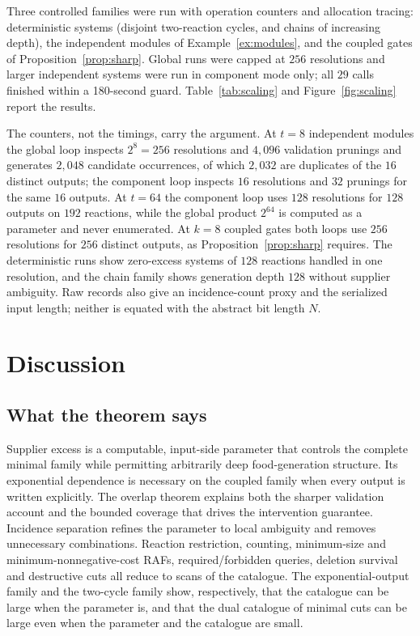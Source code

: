 \documentclass[11pt,a4paper]{article}
\theoremstyle{plain}
\theoremstyle{definition}
\theoremstyle{remark}
\begin{document}
Three controlled families were run with operation counters and allocation tracing: deterministic systems (disjoint two-reaction cycles, and chains of increasing depth), the independent modules of Example~\ref{ex:modules}, and the coupled gates of Proposition~\ref{prop:sharp}. Global runs were capped at $256$ resolutions and larger independent systems were run in component mode only; all $29$ calls finished within a 180-second guard. Table~\ref{tab:scaling} and Figure~\ref{fig:scaling} report the results.

The counters, not the timings, carry the argument. At $t=8$ independent modules the global loop inspects $2^8=256$ resolutions and $4{,}096$ validation prunings and generates $2{,}048$ candidate occurrences, of which $2{,}032$ are duplicates of the $16$ distinct outputs; the component loop inspects $16$ resolutions and $32$ prunings for the same $16$ outputs. At $t=64$ the component loop uses $128$ resolutions for $128$ outputs on $192$ reactions, while the global product $2^{64}$ is computed as a parameter and never enumerated. At $k=8$ coupled gates both loops use $256$ resolutions for $256$ distinct outputs, as Proposition~\ref{prop:sharp} requires. The deterministic runs show zero-excess systems of $128$ reactions handled in one resolution, and the chain family shows generation depth $128$ without supplier ambiguity. Raw records also give an incidence-count proxy and the serialized input length; neither is equated with the abstract bit length $N$.

\section{Discussion}\label{sec:discussion}

\subsection{What the theorem says}

Supplier excess is a computable, input-side parameter that controls the complete minimal family while permitting arbitrarily deep food-generation structure. Its exponential dependence is necessary on the coupled family when every output is written explicitly. The overlap theorem explains both the sharper validation account and the bounded coverage that drives the intervention guarantee. Incidence separation refines the parameter to local ambiguity and removes unnecessary combinations. Reaction restriction, counting, minimum-size and minimum-nonnegative-cost RAFs, required/forbidden queries, deletion survival and destructive cuts all reduce to scans of the catalogue. The exponential-output family and the two-cycle family show, respectively, that the catalogue can be large when the parameter is, and that the dual catalogue of minimal cuts can be large even when the parameter and the catalogue are small.
\end{document}
